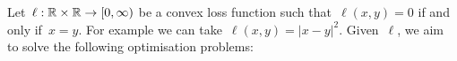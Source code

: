 

Let~$\ell : \mathbb{R} \times \mathbb{R} \to [0,\infty)$ be a convex loss function such that~$\ell(x,y) = 0$ if and only if~$x=y$. 
For example we can take~$\ell(x,y) = |x-y|^2$. 
Given~$\ell$, we aim to solve the following optimisation problems:

